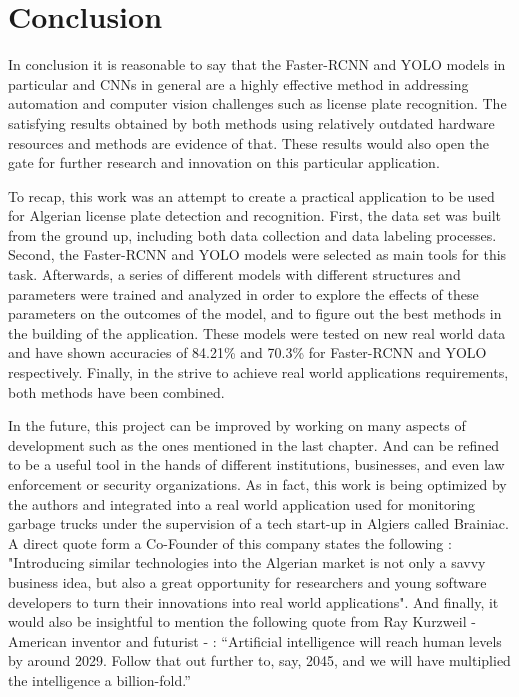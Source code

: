 \chapter*{Conclusion}
In conclusion it is reasonable to say that the Faster-RCNN and YOLO models in particular and CNNs in general are a highly effective method in addressing automation and computer vision challenges such as license plate recognition. The satisfying results obtained by both methods using relatively outdated hardware resources and methods are evidence of that. These results would also open the gate for further research and innovation on this particular application.

To recap, this work was an attempt to create a practical application to be used for Algerian license plate detection and recognition. First, the data set was built from the ground up, including both data collection and data labeling processes. Second, the Faster-RCNN and YOLO models were selected as main tools for this task. Afterwards, a series of different models with different structures and parameters were trained and analyzed in order to explore the effects of these parameters on the outcomes of the model, and to figure out the best methods in the building of the application. These models were tested on new real world data and have shown accuracies of 84.21\% and 70.3\% for Faster-RCNN and YOLO respectively. Finally, in the strive to achieve real world applications requirements, both methods have been combined.

In the future, this project can be improved by working on many aspects of development such as the ones mentioned in the last chapter. And can be refined to be a useful tool in the hands of different institutions, businesses, and even law enforcement or security organizations. As in fact, this work is being optimized by the authors and integrated into a real world application used for monitoring garbage trucks under the supervision of a tech start-up in Algiers called Brainiac. A direct quote form a Co-Founder of this company states the following : "Introducing similar technologies into the Algerian market is not only a savvy business idea, but also a great opportunity for researchers and young software developers to turn their innovations into real world applications". And finally, it would also be insightful to mention the following quote from Ray Kurzweil - American inventor and futurist - :  “Artificial intelligence will reach human levels by around 2029. Follow that out further to, say, 2045, and we will have multiplied the intelligence a billion-fold.”
